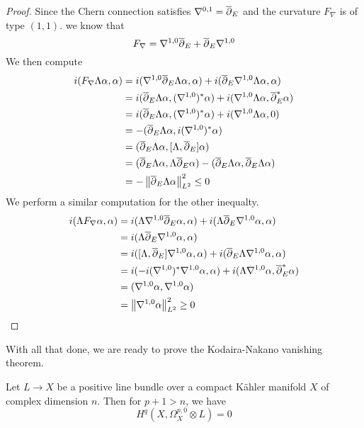 %
\begin{proof}
Since the Chern connection satisfies $\nabla^{0,1} = \overline{\partial}_E$ and the curvature
$F_\nabla$ is of type $(1,1)$. we know that
\[
F_\nabla = \nabla^{1,0}\overline{\partial}_E + \overline{\partial}_E\nabla^{1,0}
\]
We then compute
\begin{align*}
i(F_\nabla\Lambda\alpha,\alpha) &= i(\nabla^{1,0}\overline{\partial}_E\Lambda\alpha,\alpha)
+ i(\overline{\partial}_E\nabla^{1,0}\Lambda\alpha,\alpha) \\
&= i(\overline{\partial}_E\Lambda\alpha,(\nabla^{1,0})^*\alpha)
+ i(\nabla^{1,0}\Lambda\alpha,\overline{\partial}_E^*\alpha) \\
&= i(\overline{\partial}_E\Lambda\alpha,(\nabla^{1,0})^*\alpha)
+ i(\nabla^{1,0}\Lambda\alpha,0) \\
&= -(\overline{\partial}_E\Lambda\alpha, i(\nabla^{1,0})^*\alpha) \\
&= (\overline{\partial}_E\Lambda\alpha, [\Lambda,\overline{\partial}_E]\alpha) \\
&= (\overline{\partial}_E\Lambda\alpha, \Lambda\overline{\partial}_E\alpha)
- (\overline{\partial}_E\Lambda\alpha,\overline{\partial}_E\Lambda\alpha) \\
&= -\left\lVert\overline{\partial}_E\Lambda\alpha\right\rVert_{L^2}^2 \leq 0
\end{align*}
We perform a similar computation for the other inequalty.
\begin{align*}
i(\Lambda F_\nabla\alpha,\alpha) &= i(\Lambda\nabla^{1,0}\overline{\partial}_E\alpha,\alpha)
+ i(\Lambda\overline{\partial}_E\nabla^{1,0}\alpha,\alpha) \\
&= i(\Lambda\overline{\partial}_E\nabla^{1,0}\alpha,\alpha) \\
&= i([\Lambda,\overline{\partial}_E]\nabla^{1,0}\alpha,\alpha)
+i(\overline{\partial}_E\Lambda\nabla^{1,0}\alpha,\alpha) \\
&= i(-i(\nabla^{1,0})^*\nabla^{1,0}\alpha,\alpha)
+ i(\Lambda\nabla^{1,0}\alpha,\overline{\partial}_E^*\alpha) \\
&= (\nabla^{1,0}\alpha,\nabla^{1,0}\alpha) \\
&= \left\lVert\nabla^{1,0}\alpha\right\rVert_{L^2}^2 \geq 0
\end{align*}
\end{proof}
%
With all that done, we are ready to prove the Kodaira-Nakano vanishing theorem.
%
\begin{thm}
Let $L \to X$ be a positive line bundle over a compact K\"ahler manifold $X$ of complex
dimension $n$. Then for $p+1 > n$, we have
\[
H^q(X,\Omega^{p,0}_X\otimes L) = 0
\]
\end{thm}
%
